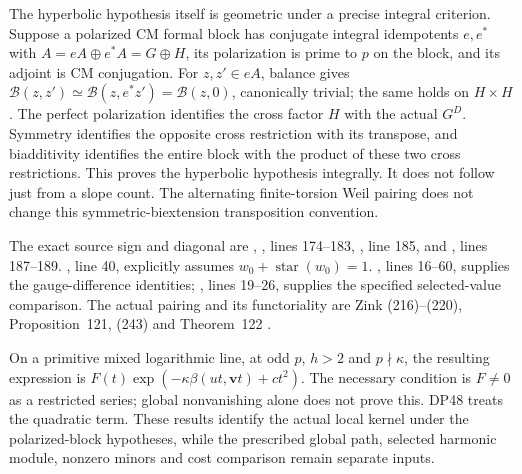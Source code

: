 The hyperbolic hypothesis itself is geometric under a precise integral criterion. Suppose a polarized CM formal block has conjugate integral idempotents $e,e^*$ with
$A=eA\oplus e^*A=G\oplus H$, its polarization is prime to $p$ on the block, and its adjoint is CM conjugation.
For $z,z'\in eA$, balance gives
$\mathcal B(z,z')\simeq\mathcal B(z,e^*z')=\mathcal B(z,0)$,
canonically trivial; the same holds on $H\times H$.
The perfect polarization identifies the cross factor $H$ with the actual $G^D$.
Symmetry identifies the opposite cross restriction with its transpose, and biadditivity identifies the entire block with the product of these two cross restrictions. This proves the hyperbolic hypothesis integrally. It does not follow just from a slope count. The alternating finite-torsion Weil pairing does not change this symmetric-biextension transposition convention.

The exact source sign and diagonal are
, , lines 174--183,
, line 185, and , lines 187--189.
, line 40, explicitly assumes $w_0+\operatorname{star}(w_0)=1$.
, lines 16--60, supplies the gauge-difference identities; , lines 19--26, supplies the specified selected-value comparison.
The actual pairing and its functoriality are Zink (216)--(220), Proposition~121, (243) and Theorem~122 \cite{Zink}.

On a primitive mixed logarithmic line, at odd $p$, $h>2$ and $p\nmid\kappa$, the resulting expression is
$F(t)\exp(-\kappa\beta(ut,\mathbf vt)+ct^2)$.
The necessary condition is $F\ne0$ as a restricted series; global nonvanishing alone does not prove this.
DP48 treats the quadratic term. These results identify the actual local kernel under the polarized-block hypotheses, while the prescribed global path, selected harmonic module, nonzero minors and cost comparison remain separate inputs.

